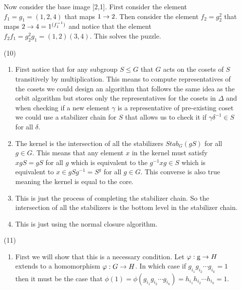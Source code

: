 \documentclass[12pt]{amsart}
\begin{document}
\begin{itemize}
      Now consider the base image [2,1]. First consider the element $f_1=g_1=(1,2,4)$ 
      that maps $1\rightarrow 2$.
      Then consider the element $f_2=g_2^2$ that maps $2\rightarrow 4=1^{(f_1^{-1})}$ and notice that the element
      $f_2f_1=g_2^2g_1=(1,2)(3,4)$. This solves the puzzle.


   \item[(10)]
   \begin{enumerate}[label= (\alph*)]
      \item First notice that for any subgroup $S\leq G$ that $G$ acts on the cosets of $S$ 
      transitively by multiplication. This means to compute representatives of the cosets
      we could design an algorithm that follows the same idea as the orbit algorithm but 
      stores only the representatives for the cosets in $\Delta$ and when checking if a new element $\gamma$
      is a representative of pre-existing coset we could use a stabilizer chain for $S$ 
      that allows us to check it if $\gamma \delta^{-1}\in S$ for all $\delta$.

      \item The kernel is the intersection of all the stabilizers $Stab_G(gS)$ for all $g\in G$. This
           means that any element $x$ in the kernel must satisfy $xgS=gS$ for all $g$ which is equivalent
           to the $g^{-1}xg\in S$ which is equivalent to $x\in gSg^{-1}=S^g$ for all $g\in G$. This converse is also true
           meaning the kernel is equal to the core.

      \item This is just the process of completing the stabilizer chain. So the intersection of all the 
      stabilizers is the bottom level in the stabilizer chain.

      \item This is just using the normal closure algorithm.
   \end{enumerate}

   \item[(11)]
   \begin{enumerate}[label= (\alph*)]
      \item First we will show that this is a necessary condition. 
      Let $\varphi:\underbar{g}\rightarrow H$ extends to a homomorphism $\varphi:G\rightarrow H$. 
      In which case if $g_{i_1}g_{i_2}\cdots g_{i_k}=1$ then it must be 
      the case that $\phi(1)=\phi(g_{i_1}g_{i_2}\cdots g_{i_k})=h_{i_1}h_{i_2}\cdots h_{i_k}=1$.


\end{enumerate}
\end{itemize}
\end{document}
